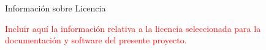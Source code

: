 
 \begin{center}

       Información sobre Licencia


\end{center}

\textcolor{red}{Incluir aquí la información relativa a la licencia seleccionada para la documentación y software del presente proyecto.
}